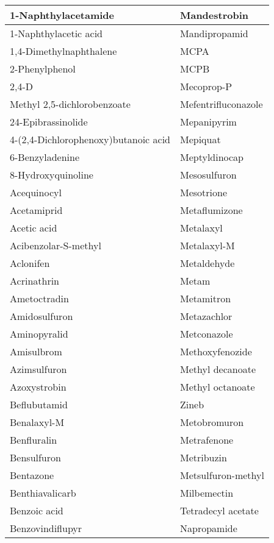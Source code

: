 \begin{small}
\begin{longtable}{|l|l|}
        1-Naphthylacetamide & Mandestrobin \\ \hline
        1-Naphthylacetic acid & Mandipropamid \\ \hline
        1,4-Dimethylnaphthalene & MCPA \\ \hline
        2-Phenylphenol & MCPB \\ \hline
        2,4-D & Mecoprop-P \\ \hline
        Methyl 2,5-dichlorobenzoate & Mefentrifluconazole \\ \hline
        24-Epibrassinolide & Mepanipyrim \\ \hline
        4-(2,4-Dichlorophenoxy)butanoic acid & Mepiquat \\ \hline
        6-Benzyladenine & Meptyldinocap \\ \hline
        8-Hydroxyquinoline & Mesosulfuron \\ \hline
        Acequinocyl & Mesotrione \\ \hline
        Acetamiprid & Metaflumizone \\ \hline
        Acetic acid & Metalaxyl \\ \hline
        Acibenzolar-S-methyl & Metalaxyl-M \\ \hline
        Aclonifen & Metaldehyde \\ \hline
        Acrinathrin & Metam \\ \hline
        Ametoctradin & Metamitron \\ \hline
        Amidosulfuron & Metazachlor \\ \hline
        Aminopyralid & Metconazole \\ \hline
        Amisulbrom & Methoxyfenozide \\ \hline
        Azimsulfuron & Methyl decanoate \\ \hline
        Azoxystrobin & Methyl octanoate \\ \hline
        Beflubutamid & Zineb \\ \hline
        Benalaxyl-M & Metobromuron \\ \hline
        Benfluralin & Metrafenone \\ \hline
        Bensulfuron & Metribuzin \\ \hline
        Bentazone & Metsulfuron-methyl \\ \hline
        Benthiavalicarb & Milbemectin \\ \hline
        Benzoic acid & Tetradecyl acetate \\ \hline
        Benzovindiflupyr & Napropamide \\ \hline

\end{longtable}
\end{small}
